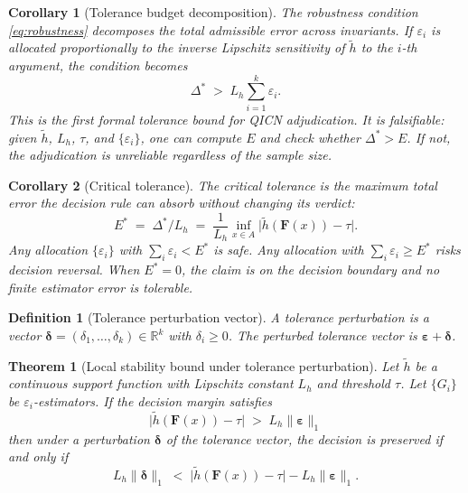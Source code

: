 \documentclass[11pt]{article}
\newtheorem{definition}{Definition}
\newtheorem{theorem}{Theorem}
\newtheorem{corollary}{Corollary}
\begin{document}
\begin{corollary}[Tolerance budget decomposition]
The robustness condition \eqref{eq:robustness} decomposes the total admissible error across invariants. If $\varepsilon_i$ is allocated proportionally to the inverse Lipschitz sensitivity of $\tilde{h}$ to the $i$-th argument, the condition becomes
\[
\Delta^{*}\;>\;L_h\sum_{i=1}^k\varepsilon_i.
\]
This is the first formal tolerance bound for QICN adjudication. It is falsifiable: given $\tilde{h}$, $L_h$, $\tau$, and $\{\varepsilon_i\}$, one can compute $E$ and check whether $\Delta^{*}>E$. If not, the adjudication is unreliable regardless of the sample size.
\end{corollary}

\begin{corollary}[Critical tolerance]
The \emph{critical tolerance} is the maximum total error the decision rule can absorb without changing its verdict:
\[
E^{*}\;=\;\Delta^{*}/L_h\;=\;\frac{1}{L_h}\inf_{x\in A}\bigl|\tilde{h}(\mathbf{F}(x))-\tau\bigr|.
\]
Any allocation $\{\varepsilon_i\}$ with $\sum_i\varepsilon_i<E^{*}$ is safe. Any allocation with $\sum_i\varepsilon_i\geq E^{*}$ risks decision reversal. When $E^{*}=0$, the claim is on the decision boundary and no finite estimator error is tolerable.
\end{corollary}

\begin{definition}[Tolerance perturbation vector]\label{def:tolerance-perturbation}
A \emph{tolerance perturbation} is a vector $\boldsymbol{\delta}=(\delta_1,\ldots,\delta_k)\in\mathbb{R}^k$ with $\delta_i\geq 0$. The perturbed tolerance vector is $\boldsymbol{\varepsilon}+\boldsymbol{\delta}$.
\end{definition}

\begin{theorem}[Local stability bound under tolerance perturbation]\label{thm:local-stability}
Let $\tilde{h}$ be a continuous support function with Lipschitz constant $L_h$ and threshold $\tau$. Let $\{G_i\}$ be $\varepsilon_i$-estimators. If the decision margin satisfies
\begin{equation}\label{eq:stability-margin}
\bigl|\tilde{h}(\mathbf{F}(x))-\tau\bigr|\;>\;L_h\|\boldsymbol{\varepsilon}\|_1
\end{equation}
then under a perturbation $\boldsymbol{\delta}$ of the tolerance vector, the decision is preserved if and only if
\begin{equation}\label{eq:stability-condition}
L_h\|\boldsymbol{\delta}\|_1\;<\;\bigl|\tilde{h}(\mathbf{F}(x))-\tau\bigr|-L_h\|\boldsymbol{\varepsilon}\|_1.
\end{equation}
\end{theorem}
\end{document}
